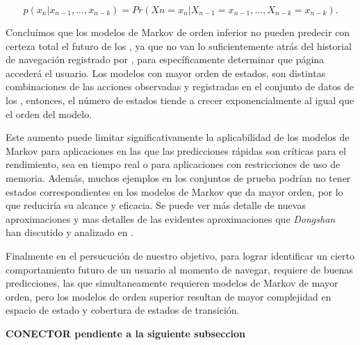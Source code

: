 \begin{equation}\label{eq:tantito}
p( x_{n} | x_{n-1},..., x_{n-k} ) = Pr(X{n} = x_{n}| X_{n-1} = x_{n-1},..., X_{n-k} = x_{n-k}) .
\end{equation}

Concluímos que los modelos de Markov de orden inferior no pueden predecir con certeza total el futuro de los \webasccesslog, ya que no van lo suficientemente atrás del historial de navegación registrado por \webasccesslog, para específicamente determinar que página accederá el usuario. Los modelos con mayor orden de estados, son distintas combinaciones de las acciones observadas y registradas en el conjunto de datos de los \webasccesslog, entonces, el número de estados tiende a crecer exponencialmente al igual que el orden del modelo.

Este aumento puede limitar significativamente la aplicabilidad de los modelos de Markov para aplicaciones en las que las predicciones rápidas son críticas para el rendimiento, sea en tiempo real o para aplicaciones con restricciones de uso de memoria. Además, muchos ejemplos en los conjuntos de prueba podrían no tener estados correspondientes en los modelos de Markov que da mayor orden, por lo que reduciría su alcance y eficacia. Se puede ver más detalle de nuevas aproximaciones y mas detalles de las evidentes aproximaciones que \emph{Dongshan~\etal}  han discutido y analizado en \cite{Dongshan2002}.

Finalmente en el persucución de nuestro objetivo, para lograr identificar un cierto comportamiento futuro de un usuario al momento de navegar, requiere de buenas predicciones, las que simultaneamente requieren modelos de Markov de mayor orden, pero los modelos de orden superior resultan de mayor complejidad en espacio de estado y cobertura de estados de transición. 











\textbf{CONECTOR pendiente a la siguiente subseccion}